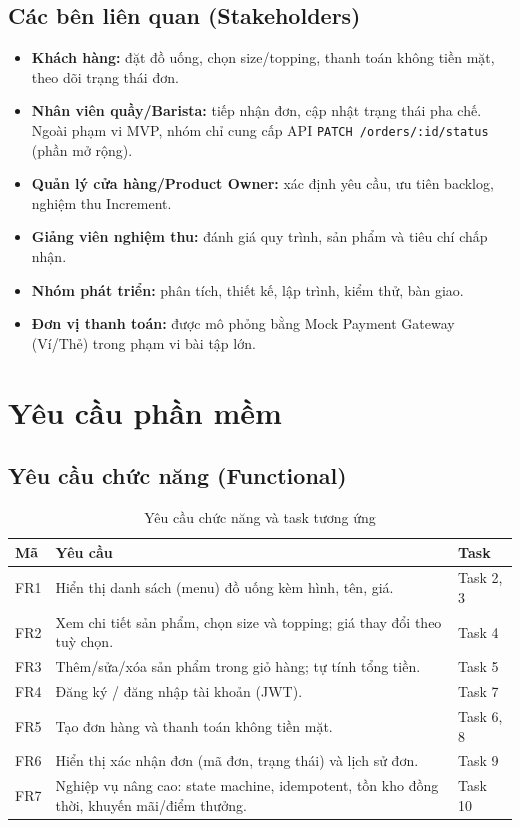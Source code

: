 \documentclass[a4paper]{article}
\begin{document}
\subsection{Các bên liên quan (Stakeholders)}
\begin{itemize}
  \item \textbf{Khách hàng:} đặt đồ uống, chọn size/topping, thanh toán không tiền mặt, theo dõi trạng thái đơn.
  \item \textbf{Nhân viên quầy/Barista:} tiếp nhận đơn, cập nhật trạng thái pha chế. Ngoài phạm vi MVP, nhóm chỉ cung cấp API \texttt{PATCH /orders/:id/status} (phần mở rộng).
  \item \textbf{Quản lý cửa hàng/Product Owner:} xác định yêu cầu, ưu tiên backlog, nghiệm thu Increment.
  \item \textbf{Giảng viên nghiệm thu:} đánh giá quy trình, sản phẩm và tiêu chí chấp nhận.
  \item \textbf{Nhóm phát triển:} phân tích, thiết kế, lập trình, kiểm thử, bàn giao.
  \item \textbf{Đơn vị thanh toán:} được mô phỏng bằng Mock Payment Gateway (Ví/Thẻ) trong phạm vi bài tập lớn.
\end{itemize}

\section{Yêu cầu phần mềm}
\subsection{Yêu cầu chức năng (Functional)}
\begin{table}[h!]
\centering
\begin{tabularx}{\textwidth}{|L{1cm}|X|L{2.6cm}|}
\hline
\textbf{Mã} & \textbf{Yêu cầu} & \textbf{Task} \\ \hline
FR1 & Hiển thị danh sách (menu) đồ uống kèm hình, tên, giá. & Task 2, 3 \\ \hline
FR2 & Xem chi tiết sản phẩm, chọn size và topping; giá thay đổi theo tuỳ chọn. & Task 4 \\ \hline
FR3 & Thêm/sửa/xóa sản phẩm trong giỏ hàng; tự tính tổng tiền. & Task 5 \\ \hline
FR4 & Đăng ký / đăng nhập tài khoản (JWT). & Task 7 \\ \hline
FR5 & Tạo đơn hàng và thanh toán không tiền mặt. & Task 6, 8 \\ \hline
FR6 & Hiển thị xác nhận đơn (mã đơn, trạng thái) và lịch sử đơn. & Task 9 \\ \hline
FR7 & Nghiệp vụ nâng cao: state machine, idempotent, tồn kho đồng thời, khuyến mãi/điểm thưởng. & Task 10 \\ \hline
\end{tabularx}
\caption{Yêu cầu chức năng và task tương ứng}
\end{table}
\end{document}

